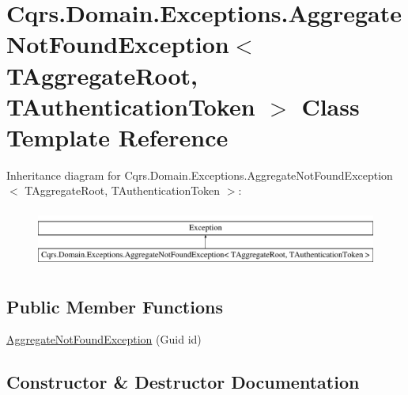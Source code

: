 \hypertarget{classCqrs_1_1Domain_1_1Exceptions_1_1AggregateNotFoundException}{}\section{Cqrs.\+Domain.\+Exceptions.\+Aggregate\+Not\+Found\+Exception$<$ T\+Aggregate\+Root, T\+Authentication\+Token $>$ Class Template Reference}
\label{classCqrs_1_1Domain_1_1Exceptions_1_1AggregateNotFoundException}
Inheritance diagram for Cqrs.\+Domain.\+Exceptions.\+Aggregate\+Not\+Found\+Exception$<$ T\+Aggregate\+Root, T\+Authentication\+Token $>$\+:\begin{figure}[H]
\begin{center}
\leavevmode
\includegraphics[height=1.947826cm]{classCqrs_1_1Domain_1_1Exceptions_1_1AggregateNotFoundException}
\end{center}
\end{figure}
\subsection*{Public Member Functions}
\begin{DoxyCompactItemize}
\item 
\hyperlink{classCqrs_1_1Domain_1_1Exceptions_1_1AggregateNotFoundException_a44057befbb31c652727d04c5b34211ee}{Aggregate\+Not\+Found\+Exception} (Guid id)
\end{DoxyCompactItemize}


\subsection{Constructor \& Destructor Documentation}
\mbox{\label{classCqrs_1_1Domain_1_1Exceptions_1_1AggregateNotFoundException_a44057befbb31c652727d04c5b34211ee}} 
